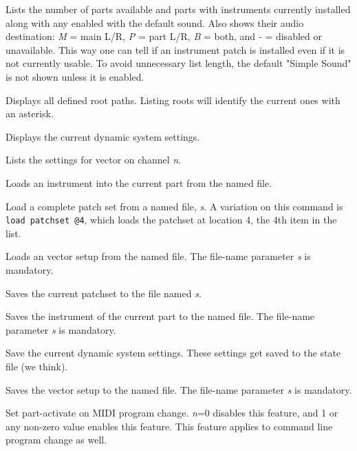       Lists the number of parts available and parts with instruments
      currently installed along with any enabled with the default sound.
      Also shows their audio destination:
      \textsl{M} = main L/R, \textsl{P} = part L/R, \textsl{B} = both, and
      \textsl{-} = disabled or unavailable.
      This way one can tell if an instrument patch is installed even if it is
      not currently usable.
      To avoid unnecessary list length, the default "Simple Sound" is not shown
      unless it is enabled.

      Displays all defined root paths.
      Listing roots will identify the current ones with an asterisk.

      Displays the current dynamic system settings.

      Lists the settings for vector on channel \textsl{n}.

      Loads an instrument into the current part from the named file.

      Load a complete patch set from a named file, \textsl{s}.
      A variation on this command is \texttt{load patchset @4}, which
      loads the patchset at location 4, the 4th item in the list.

      Loads an vector setup from the named file.
      The file-name parameter \textsl{s} is mandatory.

      Saves the current patchset to the file named \textsl{s}.

      Saves the instrument of the current part to the named file.
      The file-name parameter \textsl{s} is mandatory.

      Save the current dynamic system settings.
      These settings get saved to the state file (we think).

      Saves the vector setup to the named file.
      The file-name parameter \textsl{s} is mandatory.

      Set part-activate on MIDI program change.
      \textsl{n}=0 disables this feature, and
      1 or any non-zero value enables this feature.
      This feature applies to command line program change as well.

